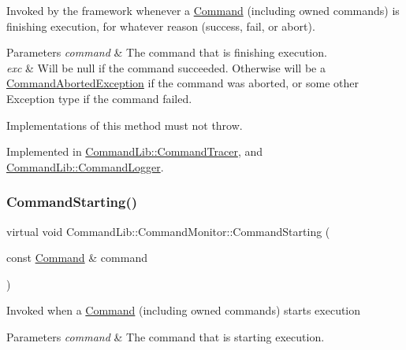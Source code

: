 Invoked by the framework whenever a \mbox{\hyperlink{class_command_lib_1_1_command}{Command}} (including owned commands) is finishing execution, for whatever reason (success, fail, or abort). 


\begin{DoxyParams}{Parameters}
{\em command} & The command that is finishing execution. \\
\hline
{\em exc} & Will be null if the command succeeded. Otherwise will be a \mbox{\hyperlink{class_command_lib_1_1_command_aborted_exception}{Command\+Aborted\+Exception}} if the command was aborted, or some other Exception type if the command failed. \\
\hline
\end{DoxyParams}


Implementations of this method must not throw. 

Implemented in \mbox{\hyperlink{class_command_lib_1_1_command_tracer_a8ed510ffcee868c92e388d1e3af304d7}{Command\+Lib\+::\+Command\+Tracer}}, and \mbox{\hyperlink{class_command_lib_1_1_command_logger_a445d24aff515f378c9cf3daacd980e22}{Command\+Lib\+::\+Command\+Logger}}.

\mbox{\label{class_command_lib_1_1_command_monitor_a3924a1e128ac5adbf9455b988b56385c}} 
\subsubsection{\texorpdfstring{Command\+Starting()}{CommandStarting()}}
{\footnotesize\ttfamily virtual void Command\+Lib\+::\+Command\+Monitor\+::\+Command\+Starting (\begin{DoxyParamCaption}\item[{const \mbox{\hyperlink{class_command_lib_1_1_command}{Command}} \&}]{command }\end{DoxyParamCaption})\hspace{0.3cm}{\ttfamily [pure virtual]}}



Invoked when a \mbox{\hyperlink{class_command_lib_1_1_command}{Command}} (including owned commands) starts execution 


\begin{DoxyParams}{Parameters}
{\em command} & The command that is starting execution. \\
\hline
\end{DoxyParams}


